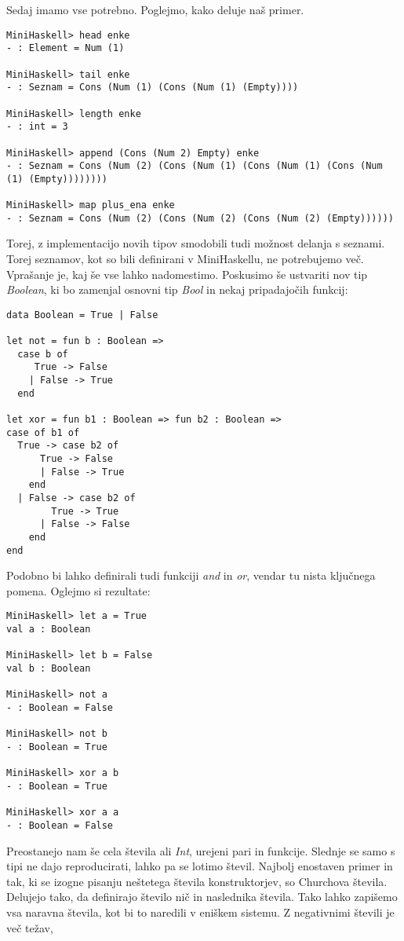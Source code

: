 \documentclass[12pt,a4paper,openany]{book}
\begin{document}
Sedaj imamo vse potrebno. Poglejmo, kako deluje naš primer.
\begin{lstlisting}
MiniHaskell> head enke
- : Element = Num (1)

MiniHaskell> tail enke
- : Seznam = Cons (Num (1) (Cons (Num (1) (Empty))))

MiniHaskell> length enke
- : int = 3

MiniHaskell> append (Cons (Num 2) Empty) enke
- : Seznam = Cons (Num (2) (Cons (Num (1) (Cons (Num (1) (Cons (Num (1) (Empty))))))))

MiniHaskell> map plus_ena enke
- : Seznam = Cons (Num (2) (Cons (Num (2) (Cons (Num (2) (Empty))))))
\end{lstlisting}
Torej, z implementacijo novih tipov smodobili tudi možnost delanja s seznami. Torej seznamov, kot so bili definirani v MiniHaskellu, ne potrebujemo več. Vprašanje je, kaj še vse lahko nadomestimo.
Poskusimo še ustvariti nov tip \emph{Boolean}, ki bo zamenjal osnovni tip \emph{Bool} in nekaj pripadajočih funkcij:
\begin{lstlisting}
data Boolean = True | False
	
let not = fun b : Boolean => 
  case b of 
     True -> False 
    | False -> True 
  end

let xor = fun b1 : Boolean => fun b2 : Boolean =>
case of b1 of
  True -> case b2 of
	  True -> False
	  | False -> True
	end
  | False -> case b2 of
		True -> True
	  | False -> False
	end
end
\end{lstlisting}
Podobno bi lahko definirali tudi funkciji \emph{and} in \emph{or}, vendar tu nista ključnega pomena. Oglejmo si rezultate:
\begin{lstlisting}
MiniHaskell> let a = True
val a : Boolean

MiniHaskell> let b = False
val b : Boolean

MiniHaskell> not a
- : Boolean = False

MiniHaskell> not b
- : Boolean = True

MiniHaskell> xor a b
- : Boolean = True

MiniHaskell> xor a a
- : Boolean = False
\end{lstlisting}
Preostanejo nam še cela števila ali \emph{Int}, urejeni pari in funkcije. Slednje se samo s tipi ne dajo reproducirati, lahko pa se lotimo števil. Najbolj enostaven primer in tak, ki se izogne pisanju neštetega števila 
konstruktorjev, so Churchova števila. Delujejo tako, da definirajo število nič in naslednika števila. Tako lahko zapišemo vsa naravna števila, kot bi to naredili v eniškem sistemu. Z negativnimi števili je več težav, 
\end{document}
